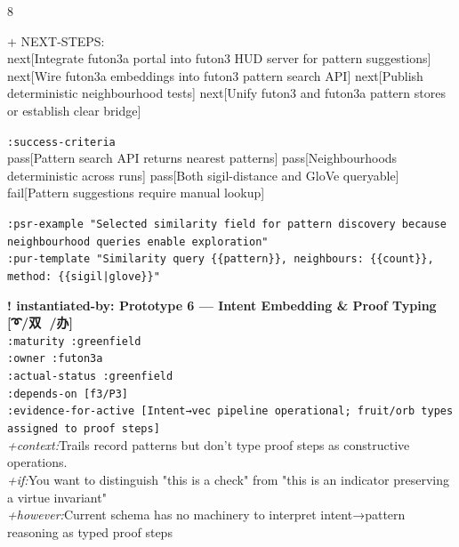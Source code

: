 \documentclass[landscape]{article}
\newcommand{\flexitag}[1]{\textcolor[gray]{0.35}{\textit{#1}}}
\newenvironment{devmapactive}{%
  \def\FrameCommand{\colorbox{devmapactivebg}}%
  \setlength{\fboxsep}{2pt}%
  \MakeFramed{\advance\hsize-\width \FrameRestore}%
}{\endMakeFramed}
\newenvironment{devmapgreenfield}{%
  \def\FrameCommand{\colorbox{devmapgreenfieldbg}}%
  \setlength{\fboxsep}{2pt}%
  \MakeFramed{\advance\hsize-\width \FrameRestore}%
}{\endMakeFramed}
\begin{document}
\begin{paracol}{8}
\begin{devmapactive}
\par
  + NEXT-STEPS:\\
    next[Integrate futon3a portal into futon3 HUD server for pattern suggestions] next[Wire futon3a embeddings into futon3 pattern search API] next[Publish deterministic neighbourhood tests] next[Unify futon3 and futon3a pattern stores or establish clear bridge]\\
\par
  \texttt{:\allowbreak{}success-\allowbreak{}criteria}\\
    pass[Pattern search API returns nearest patterns] pass[Neighbourhoods deterministic across runs] pass[Both sigil-distance and GloVe queryable] fail[Pattern suggestions require manual lookup]\\
\par
  \texttt{:\allowbreak{}psr-\allowbreak{}example "Selected similarity field for pattern discovery because neighbourhood queries enable exploration"}\\
  \texttt{:\allowbreak{}pur-\allowbreak{}template "Similarity query \{\{pattern\}\},\allowbreak{} neighbours:\allowbreak{} \{\{count\}\},\allowbreak{} method:\allowbreak{} \{\{sigil|\allowbreak{}glove\}\}"}\\
\par
\par
\end{devmapactive}
\begin{devmapgreenfield}
\textbf{! instantiated-by: Prototype 6 — Intent Embedding \& Proof Typing [➰/双 🍍/办]}\\
  \texttt{:\allowbreak{}maturity :\allowbreak{}greenfield}\\
  \texttt{:\allowbreak{}owner :\allowbreak{}futon3a}\\
  \texttt{:\allowbreak{}actual-\allowbreak{}status :\allowbreak{}greenfield}\\
  \texttt{:\allowbreak{}depends-\allowbreak{}on [f3/\allowbreak{}P3]}\\
  \texttt{:\allowbreak{}evidence-\allowbreak{}for-\allowbreak{}active [Intent→vec pipeline operational;\allowbreak{} fruit/\allowbreak{}orb types assigned to proof steps]}\\
  \flexitag{+context:}Trails record patterns but don’t type proof steps as constructive operations.\\
  \flexitag{+if:}You want to distinguish "this is a check" from "this is an indicator preserving a virtue invariant"\\
  \flexitag{+however:}Current schema has no machinery to interpret intent→pattern reasoning as typed proof steps\\

\end{devmapgreenfield}
\end{paracol}
\end{document}
